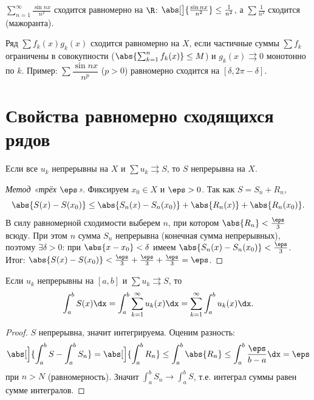 \begin{example}
$\displaystyle\sum_{n=1}^\infty\frac{\sin nx}{n^2}$ сходится равномерно на $\R$:
$\abs[\big]{\tfrac{\sin nx}{n^2}}\le\tfrac1{n^2}$, а $\sum\tfrac1{n^2}$ сходится (мажоранта).
\end{example}

\begin{remark}
Ряд $\sum f_k(x)g_k(x)$ сходится равномерно на $X$, если частичные суммы $\sum f_k$ ограничены в
совокупности ($\abs{\sum_{k=1}^n f_k(x)}\le M$) и $g_k(x)\rightrightarrows0$ монотонно по $k$.
Пример: $\sum\dfrac{\sin nx}{n^p}$ ($p>0$) равномерно сходится на $[\delta,2\pi-\delta]$.
\end{remark}

\section{Свойства равномерно сходящихся рядов}

\begin{theorem}
Если все $u_k$ непрерывны на $X$ и $\sum u_k\rightrightarrows S$, то $S$ непрерывна на $X$.
\end{theorem}

\begin{proof}[Метод «трёх $\eps$»]
Фиксируем $x_0\in X$ и $\eps>0$. Так как $S=S_n+R_n$,
\[
  \abs{S(x)-S(x_0)}\le\abs{S_n(x)-S_n(x_0)}+\abs{R_n(x)}+\abs{R_n(x_0)} .
\]
В силу равномерной сходимости выберем $n$, при котором $\abs{R_n}<\tfrac\eps3$ всюду. При этом $n$
сумма $S_n$ непрерывна (конечная сумма непрерывных), поэтому $\exists\delta>0$: при
$\abs{x-x_0}<\delta$ имеем $\abs{S_n(x)-S_n(x_0)}<\tfrac\eps3$. Итог:
$\abs{S(x)-S(x_0)}<\tfrac\eps3+\tfrac\eps3+\tfrac\eps3=\eps$.
\end{proof}

\begin{theorem}
Если $u_k$ непрерывны на $[a,b]$ и $\sum u_k\rightrightarrows S$, то
\[
  \int_a^b S(x)\dx=\int_a^b\sum_{k=1}^\infty u_k(x)\dx=\sum_{k=1}^\infty\int_a^b u_k(x)\dx .
\]
\end{theorem}

\begin{proof}
$S$ непрерывна, значит интегрируема. Оценим разность:
\[
  \abs[\Big]{\int_a^b S-\int_a^b S_n}=\abs[\Big]{\int_a^b R_n}\le\int_a^b\abs{R_n}
   \le\int_a^b\frac{\eps}{b-a}\dx=\eps
\]
при $n>N$ (равномерность). Значит $\int_a^b S_n\to\int_a^b S$, т.е. интеграл суммы равен сумме
интегралов.
\end{proof}

